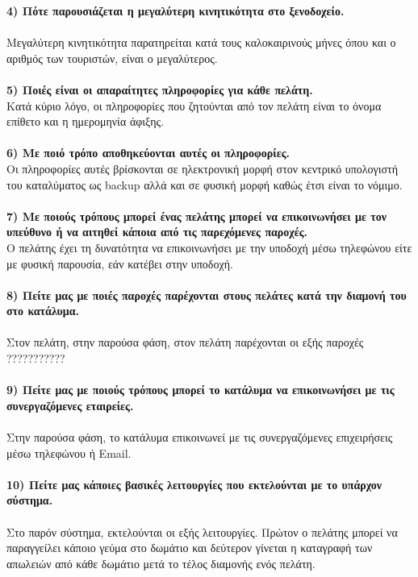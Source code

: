 \noindent
\textbf{4) Πότε παρουσιάζεται η μεγαλύτερη κινητικότητα στο ξενοδοχείο.} \\ \\
\noindent
Μεγαλύτερη κινητικότητα παρατηρείται κατά τους καλοκαιρινούς μήνες όπου 
και ο αριθμός των τουριστών, είναι ο μεγαλύτερος.\\ \\

\noindent
\textbf{5) Ποιές είναι οι απαραίτητες πληροφορίες για κάθε πελάτη.} \\
\noindent
Κατά κύριο λόγο, οι πληροφορίες που ζητούνται από τον πελάτη είναι 
το όνομα επίθετο και η ημερομηνία άφιξης. \\ \\

\noindent
\textbf{6) Με ποιό τρόπο αποθηκεύονται αυτές οι πληροφορίες.} \\
\noindent
Οι πληροφορίες αυτές βρίσκονται σε ηλεκτρονική μορφή στον κεντρικό υπολογιστή
του καταλύματος ως backup αλλά και σε φυσική μορφή καθώς έτσι είναι το νόμιμο. \\ \\

\noindent
\textbf{7) Με ποιούς τρόπους μπορεί ένας πελάτης μπορεί  να επικοινωνήσει 
	με τον υπεύθυνο ή να αιτηθεί κάποια από τις παρεχόμενες παροχές.} \\
\noindent
Ο πελάτης έχει τη δυνατότητα να επικοινωνήσει με την υποδοχή μέσω τηλεφώνου
είτε με φυσική παρουσία, εάν κατέβει στην υποδοχή.\\ \\

\noindent
\textbf{8) Πείτε μας με ποιές παροχές παρέχονται στους πελάτες κατά την διαμονή 
	του στο κατάλυμα.} \\ \\
\noindent
Στον πελάτη, στην παρούσα φάση, στον πελάτη παρέχονται οι εξής παροχές  ???????????\\ \\

\noindent
\textbf{9) Πείτε μας με ποιούς τρόπους μπορεί το κατάλυμα να επικοινωνήσει με τις 
	συνεργαζόμενες εταιρείες.} \\ \\
\noindent
Στην παρούσα φάση, το κατάλυμα επικοινωνεί με τις συνεργαζόμενες επιχειρήσεις
μέσω τηλεφώνου ή Email.\\ \\

\noindent
\textbf{10) Πείτε μας κάποιες βασικές λειτουργίες που εκτελούνται με το υπάρχον 
	σύστημα.}\\ \\
Στο παρόν σύστημα, εκτελούνται οι εξής λειτουργίες. Πρώτον ο πελάτης μπορεί να
παραγγείλει κάποιο γεύμα στο δωμάτιο και δεύτερον γίνεται η καταγραφή των 
απωλειών από κάθε δωμάτιο μετά το τέλος διαμονής ενός πελάτη.\\ \\ 

